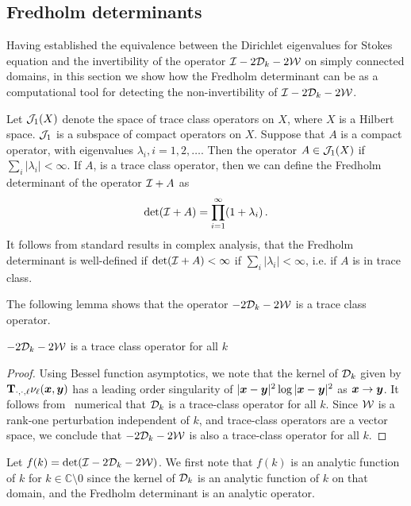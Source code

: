 \subsection{Fredholm determinants}
Having established the equivalence between the Dirichlet eigenvalues
for Stokes equation and the invertibility of
the operator $\mathcal I - 2{\mathcal D}_{k} - 2{\mathcal W}$ on simply connected domains, in this section
we show how the Fredholm determinant can be as a computational tool for detecting
the non-invertibility of $\mathcal I - 2{\mathcal D}_{k} - 2{\mathcal W}$.

Let ${\mathcal J}_{1}(X)$ denote the space of trace class operators 
on $X$, where $X$ is a Hilbert space.
${\mathcal J}_{1}$ is a subspace of compact operators on $X$.
Suppose that $A$ is a compact operator, with eigenvalues
$\lambda_{i}, i=1,2,\ldots$.
Then the operator $A \in {\mathcal J}_{1}(X)$ if
$\sum_{i} |\lambda_{i}| < \infty$.
If $A$, is a trace class operator, then we can define 
the Fredholm determinant of the operator $\mathcal I + A$ as
\begin{equation}
\text{det}(\mathcal I +A) = \prod_{i=1}^{\infty} (1+\lambda_{i}) \, .
\end{equation}
It follows from standard results in complex analysis, 
that the Fredholm determinant is well-defined if 
$\text{det}(\mathcal I+A) < \infty$ if $\sum_{i} |\lambda_{i}| < \infty$,
i.e. if $A$ is in trace class.

The following lemma shows that the operator 
$-2{\mathcal D}_{k} - 2{\mathcal W}$ is a trace class operator.
\begin{lemma} 
$-2{\mathcal D}_{k} - 2{\mathcal W}$ is a trace class operator for all $k$ 
\end{lemma}
\begin{proof}
Using Bessel function asymptotics, we note that the
kernel of ${\mathcal D}_{k}$ given by
${\bf T}_{\cdot,\cdot,\ell}\nu_{\ell}({\boldsymbol x},{\boldsymbol y})$
has a leading order singularity of $|{\boldsymbol x}-{\boldsymbol y}|^2 \log{|{\boldsymbol x}-{\boldsymbol y}|^2}$ as ${\boldsymbol x}\to {\boldsymbol y}$.
It follows from~\cite{bornemann2010} numerical that ${\mathcal D}_{k}$
is a trace-class operator for all $k$.
Since ${\mathcal W}$ is a rank-one perturbation independent of $k$, and trace-class
operators are a vector space, we conclude that
$-2{\mathcal D}_{k} - 2{\mathcal W}$ is also a trace-class operator for all $k$.
\end{proof}

Let $f(k) = \text{det}(\mathcal I - 2{\mathcal D}_{k} - 2{\mathcal W})$.
We first note that $f(k)$ is an analytic function of $k$
for $k \in \mathbb{C} \setminus 0$
since the kernel of ${\mathcal D}_{k}$ is an 
analytic function of $k$ on that domain, 
and the Fredholm determinant is an analytic operator.

